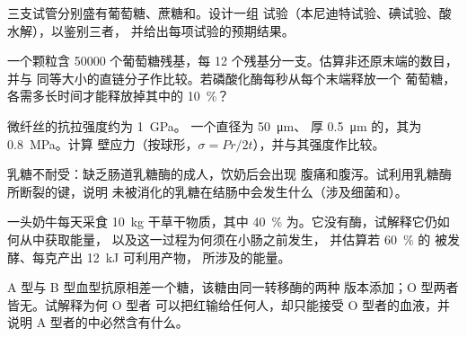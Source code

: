 \begin{exercise}[$\star\star$]\label{exo:b1:carbohydrates:6}
三支试管分别盛有葡萄糖、蔗糖和。设计一组
试验（本尼迪特试验、碘试验、酸水解），以鉴别三者，
并给出每项试验的预期结果。
\end{exercise}

\begin{exercise}[$\star\star$]\label{exo:b1:carbohydrates:7}
一个颗粒含 \num{50000} 个葡萄糖残基，每
12 个残基分一支。估算非还原末端的数目，并与
同等大小的直链分子作比较。若磷酸化酶每秒从每个末端释放一个
葡萄糖，各需多长时间才能释放掉其中的
\qty{10}{\%}？
\end{exercise}

\begin{exercise}[$\star\star$]\label{exo:b1:carbohydrates:8}
微纤丝的抗拉强度约为 \qty{1}{GPa}。
一个直径为 \qty{50}{\micro m}、
厚 \qty{0.5}{\micro m} 的，其为 \qty{0.8}{MPa}。计算
壁应力（按球形，$\sigma = Pr/2t$），并与其强度作比较。
\end{exercise}

\begin{exercise}[$\star\star$]\label{exo:b1:carbohydrates:9}
乳糖不耐受：缺乏肠道乳糖酶的成人，饮奶后会出现
腹痛和腹泻。试利用乳糖酶所断裂的键，说明
未被消化的乳糖在结肠中会发生什么（涉及细菌和）。
\end{exercise}

\begin{exercise}[$\star\star\star$]\label{exo:b1:carbohydrates:10}
一头奶牛每天采食 \qty{10}{kg} 干草干物质，其中 \qty{40}{\%}
为。它没有酶，试解释它仍如何从中获取能量，
以及这一过程为何须在小肠之前发生，
并估算若 \qty{60}{\%} 的
被发酵、每克产出 \qty{12}{kJ} 可利用产物，
所涉及的能量。
\end{exercise}

\begin{exercise}[$\star\star\star$]\label{exo:b1:carbohydrates:11}
A 型与 B 型血型抗原相差一个糖，该糖由同一转移酶的两种
版本添加；O 型两者皆无。试解释为何 O 型者
可以把红输给任何人，却只能接受 O 型者的血液，并说明
A 型者的中必然含有什么。
\end{exercise}

